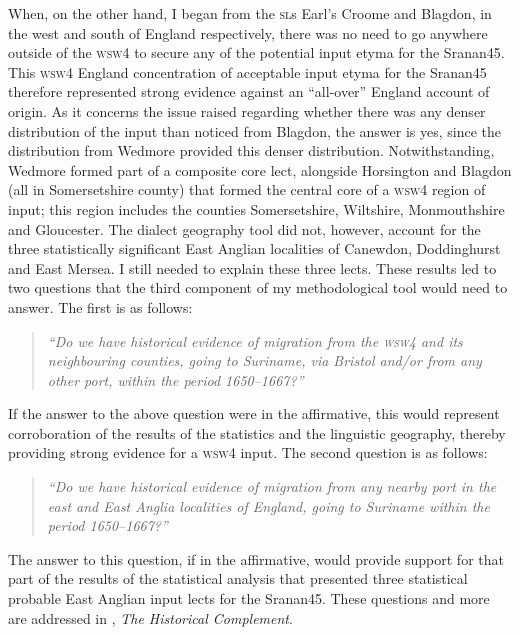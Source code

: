 When, on the other hand, I began from the \textsc{sl}s Earl's Croome and Blagdon, in the west and south of England respectively, there was no need to go anywhere outside of the \textsc{wsw4} to secure any of the potential input etyma for the Sranan45. This \textsc{wsw4} England concentration of acceptable input etyma for the Sranan45 therefore represented strong evidence against an ``all-over'' England account of origin. As it concerns the issue raised regarding whether there was any denser distribution of the input than noticed from Blagdon, the answer is yes, since the distribution from Wedmore provided this denser distribution. Notwithstanding, Wedmore formed part of a composite core lect, alongside Horsington and Blagdon (all in Somersetshire county) that formed the central core of a \textsc{wsw4} region of input; this region includes the counties Somersetshire, Wiltshire, Monmouthshire and Gloucester. The dialect geography tool did not, however, account for the three statistically significant East Anglian localities of Canewdon, Doddinghurst and East Mersea. I still needed to explain these three lects. These results led to two questions that the third component of my methodological tool would need to answer. The first is as follows:

\begin{quote}
\emph{``Do we have historical evidence of migration from the \textsc{wsw4} and its neighbouring counties, going to Suriname, via Bristol and/or from any other port, within the period 1650--1667?''}
\end{quote}

If the answer to the above question were in the affirmative, this would represent corroboration of the results of the statistics and the linguistic geography, thereby providing strong evidence for a \textsc{wsw4} input. The second question is as follows:

\begin{quote}
\emph{``Do we have historical evidence of migration from any nearby port in the east and East Anglia localities of England, going to Suriname within the period 1650--1667?''}
\end{quote}

The answer to this question, if in the affirmative, would provide support for that part of the results of the statistical analysis that presented three statistical probable East Anglian input lects for the Sranan45. These questions and more are addressed in , \emph{The Historical Complement}.
\let\cleardoublepage\clearpage
